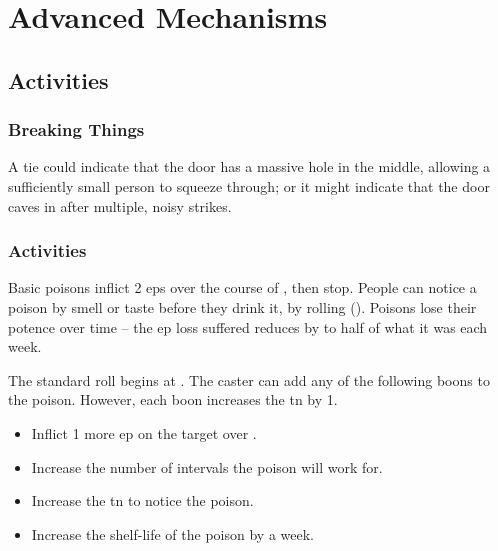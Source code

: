 \chapter{Advanced Mechanisms}

\label{skill_uses}

\section{Activities}

\begin{multicols}{2}

\togglefalse{examplecharacter}

\subsection{Breaking Things}

A tie could indicate that the door has a massive hole in the middle, allowing a sufficiently small person to squeeze through; or it might indicate that the door caves in after multiple, noisy strikes.

\subsection{ Activities}


Basic poisons inflict 2 \glspl{ep} over the course of , then stop.
People can notice a poison by smell or taste before they drink it, by rolling  (\tn[7]).
Poisons lose their potence over time -- the \gls{ep} loss suffered reduces by to half of what it was each week.

The standard roll begins at \tn[7].
The caster can add any of the following boons to the poison.
However, each boon increases the \gls{tn} by 1.

\begin{itemize}
  \item
  Inflict 1 more \gls{ep} on the target over .
  \item
  Increase the number of \glspl{interval} the poison will work for.
  \item
  Increase the \gls{tn} to notice the poison.
  \item
  Increase the shelf-life of the poison by a week.
\end{itemize}


\end{multicols}

